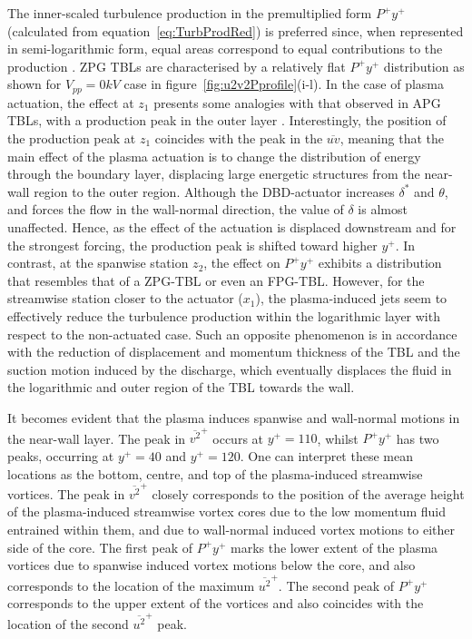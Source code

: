 The inner-scaled turbulence production in the premultiplied form $P^+y^+$ (calculated from equation~\ref{eq:TurbProdRed}) is preferred since, when represented in semi-logarithmic form, equal areas correspond to equal contributions to the production \citep{Marusic2010wbt}. ZPG TBLs are characterised by a relatively flat $P^+y^+$ distribution as shown for $V_{pp} = 0 kV$ case in figure~\ref{fig:u2v2Pprofile}(i-l). In the case of plasma actuation, the effect at $z_1$ presents some analogies with that observed in APG TBLs, with a production peak in the outer layer \citep{harun2013pressure,bradshaw1967}. Interestingly, the position of the production peak at $z_1$ coincides with the peak in the $\overline{uv}$, meaning that the main effect of the plasma actuation is to change the distribution of energy through the boundary layer, displacing large energetic structures from the near-wall region to the outer region. Although the DBD-actuator increases $\delta^*$ and $\theta$, and forces the flow in the wall-normal direction, the value of $\delta$ is almost unaffected. Hence, as the effect of the actuation is displaced downstream and for the strongest forcing, the production peak is shifted toward higher $y^+$. In contrast, at the spanwise station $z_2$, the effect on $P^+y^+$ exhibits a distribution that resembles that of a ZPG-TBL or even an FPG-TBL. However, for the streamwise station closer to the actuator ($x_1$), the plasma-induced jets seem to effectively reduce the turbulence production within the logarithmic layer with respect to the non-actuated case. Such an opposite phenomenon is in accordance with the reduction of displacement and momentum thickness of the TBL and the suction motion induced by the discharge, which eventually displaces the fluid in the logarithmic and outer region of the TBL towards the wall.

It becomes evident that the plasma induces spanwise and wall-normal motions in the near-wall layer. The peak in $\overline{v^2}^+$ occurs at $y^+= 110$, whilst $P^+y^+$ has two peaks, occurring at $y^+ = 40$ and $y^+ = 120$. One can interpret these mean locations as the bottom, centre, and top of the plasma-induced streamwise vortices. The peak in $\overline{v^2}^+$ closely corresponds to the position of the average height of the plasma-induced streamwise vortex cores due to the low momentum fluid entrained within them, and due to wall-normal induced vortex motions to either side of the core. The first peak of $P^+y^+$ marks the lower extent of the plasma vortices due to spanwise induced vortex motions below the core, and also corresponds to the location of the maximum $\overline{u^2}^+$. The second peak of $P^+y^+$ corresponds to the upper extent of the vortices and also coincides with the location of the second $\overline{u^2}^+$ peak. 

